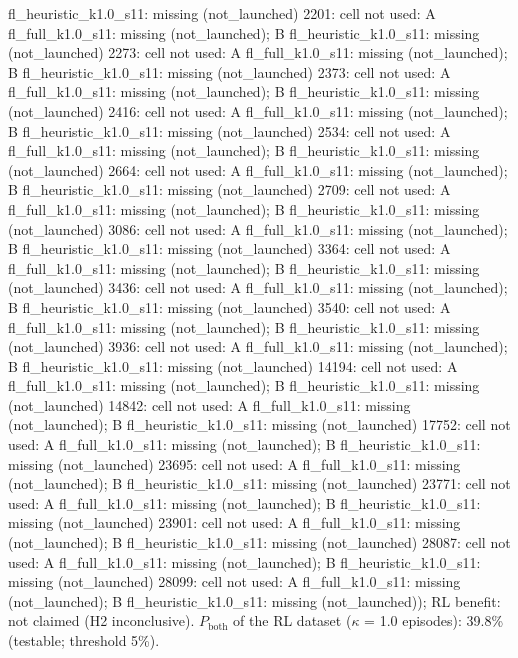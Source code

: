 \begin{table}[t]
{fl\_heuristic\_k1.0\_s11: missing (not\_launched) \textbar{} 2201: cell not used: A fl\_full\_k1.0\_s11: missing (not\_launched); B fl\_heuristic\_k1.0\_s11: missing (not\_launched) \textbar{} 2273: cell not used: A fl\_full\_k1.0\_s11: missing (not\_launched); B fl\_heuristic\_k1.0\_s11: missing (not\_launched) \textbar{} 2373: cell not used: A fl\_full\_k1.0\_s11: missing (not\_launched); B fl\_heuristic\_k1.0\_s11: missing (not\_launched) \textbar{} 2416: cell not used: A fl\_full\_k1.0\_s11: missing (not\_launched); B fl\_heuristic\_k1.0\_s11: missing (not\_launched) \textbar{} 2534: cell not used: A fl\_full\_k1.0\_s11: missing (not\_launched); B fl\_heuristic\_k1.0\_s11: missing (not\_launched) \textbar{} 2664: cell not used: A fl\_full\_k1.0\_s11: missing (not\_launched); B fl\_heuristic\_k1.0\_s11: missing (not\_launched) \textbar{} 2709: cell not used: A fl\_full\_k1.0\_s11: missing (not\_launched); B fl\_heuristic\_k1.0\_s11: missing (not\_launched) \textbar{} 3086: cell not used: A fl\_full\_k1.0\_s11: missing (not\_launched); B fl\_heuristic\_k1.0\_s11: missing (not\_launched) \textbar{} 3364: cell not used: A fl\_full\_k1.0\_s11: missing (not\_launched); B fl\_heuristic\_k1.0\_s11: missing (not\_launched) \textbar{} 3436: cell not used: A fl\_full\_k1.0\_s11: missing (not\_launched); B fl\_heuristic\_k1.0\_s11: missing (not\_launched) \textbar{} 3540: cell not used: A fl\_full\_k1.0\_s11: missing (not\_launched); B fl\_heuristic\_k1.0\_s11: missing (not\_launched) \textbar{} 3936: cell not used: A fl\_full\_k1.0\_s11: missing (not\_launched); B fl\_heuristic\_k1.0\_s11: missing (not\_launched) \textbar{} 14194: cell not used: A fl\_full\_k1.0\_s11: missing (not\_launched); B fl\_heuristic\_k1.0\_s11: missing (not\_launched) \textbar{} 14842: cell not used: A fl\_full\_k1.0\_s11: missing (not\_launched); B fl\_heuristic\_k1.0\_s11: missing (not\_launched) \textbar{} 17752: cell not used: A fl\_full\_k1.0\_s11: missing (not\_launched); B fl\_heuristic\_k1.0\_s11: missing (not\_launched) \textbar{} 23695: cell not used: A fl\_full\_k1.0\_s11: missing (not\_launched); B fl\_heuristic\_k1.0\_s11: missing (not\_launched) \textbar{} 23771: cell not used: A fl\_full\_k1.0\_s11: missing (not\_launched); B fl\_heuristic\_k1.0\_s11: missing (not\_launched) \textbar{} 23901: cell not used: A fl\_full\_k1.0\_s11: missing (not\_launched); B fl\_heuristic\_k1.0\_s11: missing (not\_launched) \textbar{} 28087: cell not used: A fl\_full\_k1.0\_s11: missing (not\_launched); B fl\_heuristic\_k1.0\_s11: missing (not\_launched) \textbar{} 28099: cell not used: A fl\_full\_k1.0\_s11: missing (not\_launched); B fl\_heuristic\_k1.0\_s11: missing (not\_launched)); RL benefit: not claimed (H2 inconclusive). $P_\mathrm{both}$ of the RL dataset ($\kappa$ = 1.0 episodes): 39.8\% (testable; threshold 5\%). 
}
\end{table}
